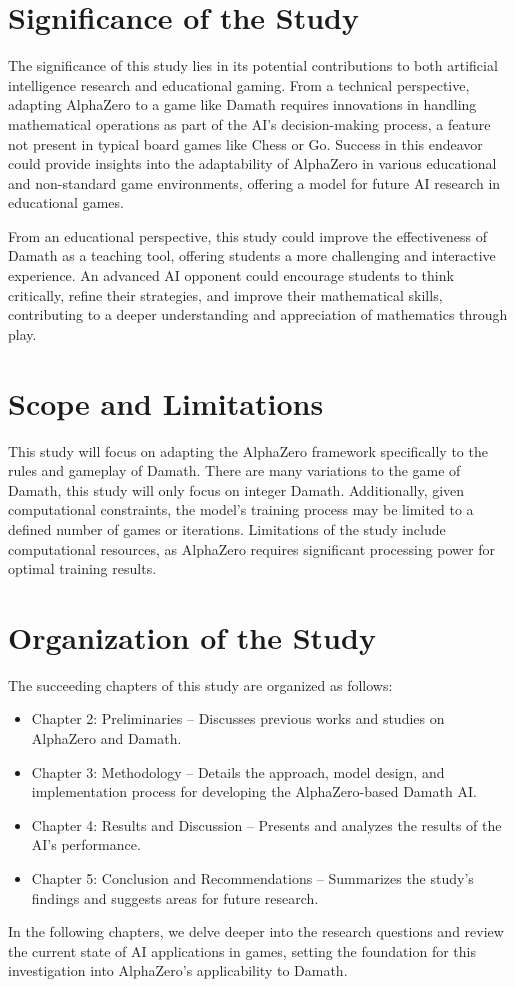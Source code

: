\section{Significance of the Study}

The significance of this study lies in its potential contributions to both artificial intelligence research and educational gaming. From a technical perspective, adapting AlphaZero to a game like Damath requires innovations in handling mathematical operations as part of the AI’s decision-making process, a feature not present in typical board games like Chess or Go. Success in this endeavor could provide insights into the adaptability of AlphaZero in various educational and non-standard game environments, offering a model for future AI research in educational games.

From an educational perspective, this study could improve the effectiveness of Damath as a teaching tool, offering students a more challenging and interactive experience. An advanced AI opponent could encourage students to think critically, refine their strategies, and improve their mathematical skills, contributing to a deeper understanding and appreciation of mathematics through play.

\section{Scope and Limitations}

This study will focus on adapting the AlphaZero framework specifically to the rules and gameplay of Damath. There are many variations to the game of Damath, this study will only focus on integer Damath. Additionally, given computational constraints, the model's training process may be limited to a defined number of games or iterations. Limitations of the study include computational resources, as AlphaZero requires significant processing power for optimal training results.

\section{Organization of the Study}

The succeeding chapters of this study are organized as follows:
\begin{itemize}
    \item Chapter 2: Preliminaries – Discusses previous works and studies on AlphaZero and Damath.
    \item Chapter 3: Methodology – Details the approach, model design, and implementation process for developing the AlphaZero-based Damath AI.
    \item Chapter 4: Results and Discussion – Presents and analyzes the results of the AI’s performance.
    \item Chapter 5: Conclusion and Recommendations – Summarizes the study’s findings and suggests areas for future research.
\end{itemize}

In the following chapters, we delve deeper into the research questions and review the current state of AI applications in games, setting the foundation for this investigation into AlphaZero’s applicability to Damath.